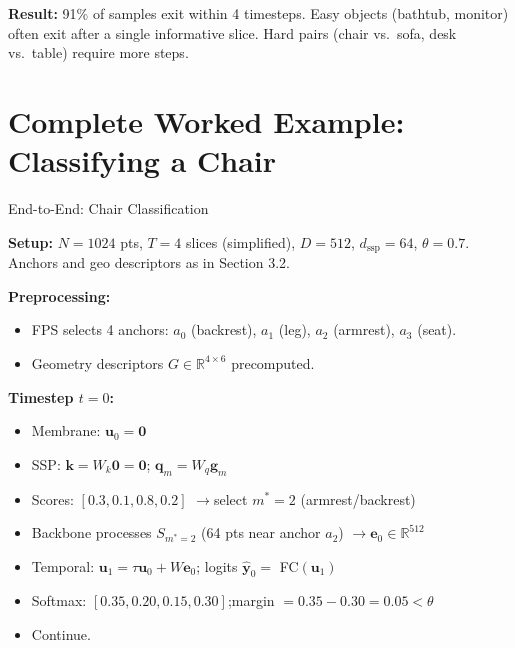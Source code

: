 \documentclass[11pt,a4paper]{article}
\begin{document}
\textbf{Result:} 91\% of samples exit within 4 timesteps.  Easy objects
(bathtub, monitor) often exit after a single informative slice.  Hard pairs
(chair vs.\ sofa, desk vs.\ table) require more steps.

\section{Complete Worked Example: Classifying a Chair}

\begin{examplebox}{End-to-End: Chair Classification}

\textbf{Setup:} $N=1024$ pts, $T=4$ slices (simplified), $D=512$, $d_\text{ssp}=64$, $\theta=0.7$.\\
Anchors and geo descriptors as in Section 3.2.

\bigskip\noindent
\textbf{Preprocessing:}
\begin{itemize}
  \item FPS selects 4 anchors: $a_0$ (backrest), $a_1$ (leg), $a_2$ (armrest), $a_3$ (seat).
  \item Geometry descriptors $G \in \mathbb{R}^{4 \times 6}$ precomputed.
\end{itemize}

\bigskip\noindent
\textbf{Timestep $t=0$:}
\begin{itemize}
  \item Membrane: $\mathbf{u}_0 = \mathbf{0}$
  \item SSP: $\mathbf{k} = W_k \mathbf{0} = \mathbf{0}$;\quad
    $\mathbf{q}_m = W_q \mathbf{g}_m$
  \item Scores: $[0.3, 0.1, 0.8, 0.2]$ \quad$\to$\quad select $m^*=2$ (armrest/backrest)
  \item Backbone processes $S_{m^*=2}$ (64 pts near anchor $a_2$) $\to \mathbf{e}_0 \in \mathbb{R}^{512}$
  \item Temporal: $\mathbf{u}_1 = \tau \mathbf{u}_0 + W \mathbf{e}_0$;\quad
    logits $\hat{\mathbf{y}}_0 = $ FC$(\mathbf{u}_1)$
  \item Softmax: $[0.35, 0.20, 0.15, 0.30]$;\quad margin $= 0.35 - 0.30 = 0.05 < \theta$
  \item Continue.
\end{itemize}


\end{examplebox}
\end{document}
